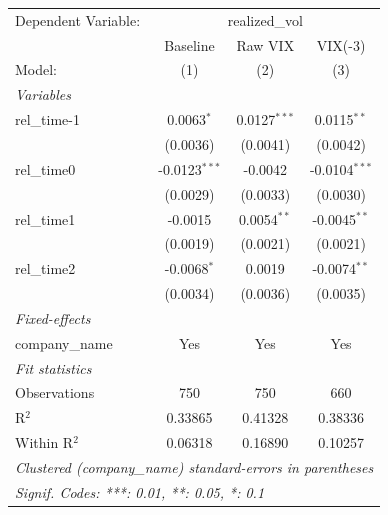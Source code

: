 
\begingroup
\centering
\begin{tabular}{lccc}
   \tabularnewline \midrule \midrule
   Dependent Variable: & \multicolumn{3}{c}{realized\_vol}\\
                  & Baseline        & Raw VIX        & VIX(-3) \\   
   Model:         & (1)             & (2)            & (3)\\  
   \midrule
   \emph{Variables}\\
   rel\_time-1    & 0.0063$^{*}$    & 0.0127$^{***}$ & 0.0115$^{**}$\\   
                  & (0.0036)        & (0.0041)       & (0.0042)\\   
   rel\_time0     & -0.0123$^{***}$ & -0.0042        & -0.0104$^{***}$\\   
                  & (0.0029)        & (0.0033)       & (0.0030)\\   
   rel\_time1     & -0.0015         & 0.0054$^{**}$  & -0.0045$^{**}$\\   
                  & (0.0019)        & (0.0021)       & (0.0021)\\   
   rel\_time2     & -0.0068$^{*}$   & 0.0019         & -0.0074$^{**}$\\   
                  & (0.0034)        & (0.0036)       & (0.0035)\\   
   \midrule
   \emph{Fixed-effects}\\
   company\_name  & Yes             & Yes            & Yes\\  
   \midrule
   \emph{Fit statistics}\\
   Observations   & 750             & 750            & 660\\  
   R$^2$          & 0.33865         & 0.41328        & 0.38336\\  
   Within R$^2$   & 0.06318         & 0.16890        & 0.10257\\  
   \midrule \midrule
   \multicolumn{4}{l}{\emph{Clustered (company\_name) standard-errors in parentheses}}\\
   \multicolumn{4}{l}{\emph{Signif. Codes: ***: 0.01, **: 0.05, *: 0.1}}\\
\end{tabular}
\par\endgroup


